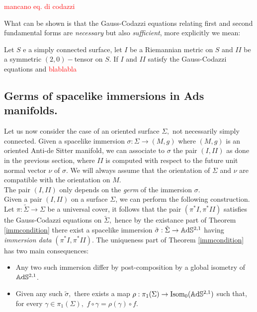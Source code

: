 \textcolor{red}{mancano eq. di codazzi}

What can be shown is that the Gauss-Codazzi equations relating first and second fundamental forms are \textit{necessary} but also \textit{sufficient}, more explicitly we mean:

\begin{theorem}\label{immcondition}
    Let $S$ e a simply connected surface, let $I$ be a Riemannian metric on $S$ and $II$  be a symmetric $(2,0)-$tensor on $S$. If $I$ and $II$ satisfy the Gauss-Codazzi equations  and  \textcolor{red}{blablabla}
\end{theorem}

\subsection{Germs of spacelike immersions in Ads manifolds.}

Let us now consider the case of an oriented surface $\Sigma,$ not necessarily simply connected. Given a spacelike immersion $\sigma:\Sigma\to(M,g)$ where $(M,g)$ is an oriented Anti-de Sitter manifold, we can associate to $\sigma$ the pair $(I,II)$ as done in the previous section, where $II$ is computed with respect to the future unit normal vector $\nu$ of $\sigma$. We will always assume that the orientation of $\Sigma$ and $\nu$ are compatible with the orientation on $M.$\\
The pair $(I, II)$ only depends on the \textit{germ} of the immersion $\sigma.$\\
Given a pair $(I,II)$ on a surface $\Sigma$, we can perform the following construction. Let $\pi:\tilde{\Sigma}\to\Sigma$ be a universal cover, it follows that the pair $(\pi^*I,\pi^*II)$ satisfies the Gauss-Codazzi equations on $\tilde{\Sigma},$ hence by the existance part of Theorem \ref{immcondition} there exist a spacelike immersion $\tilde{\sigma}:\tilde{\Sigma}\to\mathbb{A}\mathrm{d}\mathbb{S}^{2,1}$ having \textit{immersion data} $(\pi^*I,\pi^*II)$. The uniqueness part of Theorem \ref{immcondition} has two main consequences: 

\begin{itemize}
    \item Any two such immersion differ by post-composition by a global isometry of $\mathbb{A}\mathrm{d}\mathbb{S}^{2,1}$. 
    \item Given any such $\tilde{\sigma},$ there exists a map $\rho:\pi_1(\Sigma)\to\text{Isom}_0(\mathbb{A}\mathrm{d}\mathbb{S}^{2,1})$ such that, for every $\gamma\in\pi_1(\Sigma),$ $f\circ\gamma=\rho(\gamma)\circ f$. 
\end{itemize}

